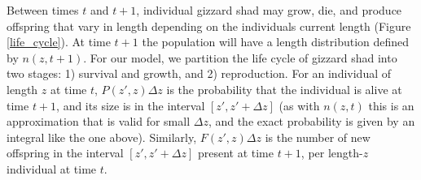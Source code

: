 \documentclass[preprint,review,12pt,authoryear]{elsarticle}
\begin{document}
Between times $t$ and $t+1$, individual gizzard shad may grow, die, and produce offspring that vary in length depending on the individuals current length (Figure \ref{life_cycle}). 
At time $t+1$ the population will have a length distribution defined by $n(z, t+1)$. 
For our model, we partition the life cycle of gizzard shad into two stages: 1) survival and growth, and  2) reproduction. 
For an individual of length $z$ at time $t$, $P(z',z)\Delta z$ is the probability that the individual is alive at time $t+1$, and its size is in the interval $[z', z' + \Delta z]$ (as with $n(z,t)$ this is an approximation that is valid for small $\Delta z$, and the exact probability is given by an integral like the one above). 
Similarly, $F(z',z)\Delta z$ is the number of new offspring in the interval $[z', z' + \Delta z]$ present at time $t+1$, per length-$z$ individual at time $t$.
\end{document}
